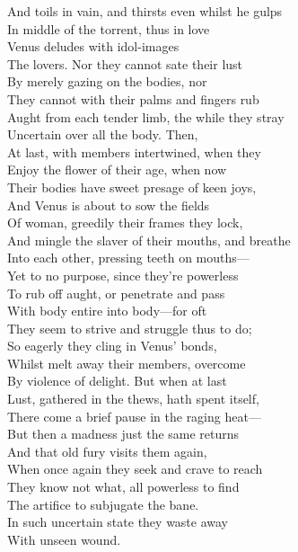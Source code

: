 And toils in vain, and thirsts even whilst he gulps\\
In middle of the torrent, thus in love\\
Venus deludes with idol-images\\
The lovers. Nor they cannot sate their lust\\
By merely gazing on the bodies, nor\\
They cannot with their palms and fingers rub\\
Aught from each tender limb, the while they stray\\
Uncertain over all the body. Then,\\
At last, with members intertwined, when they\\
Enjoy the flower of their age, when now\\
Their bodies have sweet presage of keen joys,\\
And Venus is about to sow the fields\\
Of woman, greedily their frames they lock,\\
And mingle the slaver of their mouths, and breathe\\
Into each other, pressing teeth on mouths—\\
Yet to no purpose, since they're powerless\\
To rub off aught, or penetrate and pass\\
With body entire into body—for oft\\
They seem to strive and struggle thus to do;\\
So eagerly they cling in Venus' bonds,\\
Whilst melt away their members, overcome\\
By violence of delight. But when at last\\
Lust, gathered in the thews, hath spent itself,\\
There come a brief pause in the raging heat—\\
But then a madness just the same returns\\
And that old fury visits them again,\\
When once again they seek and crave to reach\\
They know not what, all powerless to find\\
The artifice to subjugate the bane.\\
In such uncertain state they waste away\\
With unseen wound.\\
\\
